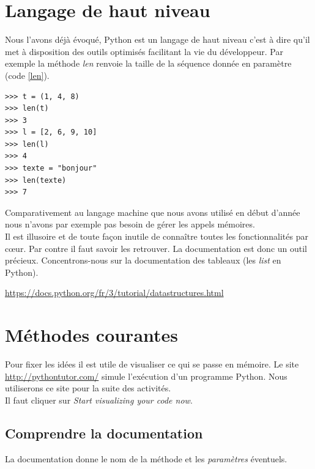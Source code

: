 \documentclass[a4paper,11pt]{article}
\begin{document}
\begin{Form}
\section{Langage de haut niveau}
Nous l'avons déjà évoqué, Python est un langage de haut niveau c'est à dire qu'il met à disposition des outils optimisés facilitant la vie du développeur. Par exemple la méthode \emph{len} renvoie la taille de la séquence donnée en paramètre (code \ref{len}).
\begin{code}[!h]
\begin{lstlisting}
>>> t = (1, 4, 8)
>>> len(t)
>>> 3
>>> l = [2, 6, 9, 10]
>>> len(l)
>>> 4
>>> texte = "bonjour"
>>> len(texte)
>>> 7
\end{lstlisting}
\label{len}
\end{code}

Comparativement au langage machine que nous avons utilisé en début d'année nous n'avons par exemple pas besoin de gérer les appels mémoires.\\
Il est illusoire et de toute façon inutile de connaître toutes les fonctionnalités par cœur. Par contre il faut savoir les retrouver. La documentation est donc un outil précieux. Concentrons-nous sur la documentation des tableaux (les \emph{list} en Python).
\begin{center}
\url{https://docs.python.org/fr/3/tutorial/datastructures.html}
\end{center}
\section{Méthodes courantes}
Pour fixer les idées il est utile de visualiser ce qui se passe en mémoire. Le site \url{http://pythontutor.com/} simule l'exécution d'un programme Python. Nous utiliserons ce site pour la suite des activités.\\
Il faut cliquer sur \emph{Start visualizing your code now}.
\subsection{Comprendre la documentation}
La documentation donne le nom de la méthode et les \emph{paramètres} éventuels.



\end{Form}
\end{document}
